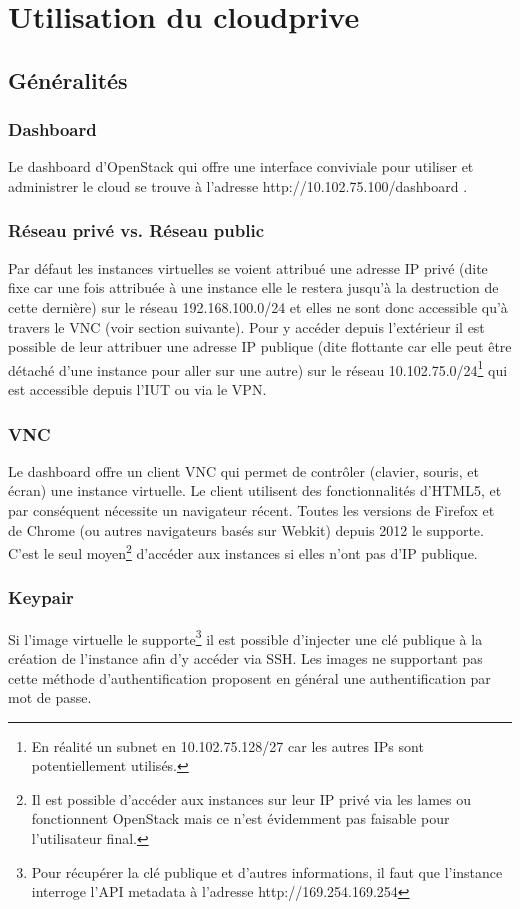 \documentclass[a4paper,oneside]{report}
\begin{document}
\appendix
\chapter{Utilisation du \gls{cloudprive}}
\section{Généralités}
\subsection{Dashboard}
Le dashboard d'OpenStack qui offre une interface conviviale pour utiliser et administrer le cloud se trouve à l'adresse http://10.102.75.100/dashboard .

\subsection{Réseau privé vs. Réseau public}
Par défaut les instances virtuelles se voient attribué une adresse IP privé (dite fixe car une fois attribuée à une instance elle le restera jusqu'à la destruction de cette dernière) sur le réseau 192.168.100.0/24 et elles ne sont donc accessible qu'à travers le VNC (voir section suivante).
Pour y accéder depuis l'extérieur il est possible de leur attribuer une adresse IP publique (dite flottante car elle peut être détaché d'une instance pour aller sur une autre) sur le réseau 10.102.75.0/24\footnote{En réalité un subnet en 10.102.75.128/27 car les autres IPs sont potentiellement utilisés.} qui est accessible depuis l'IUT ou via le VPN.

\subsection{VNC}
Le dashboard offre un client VNC qui permet de contrôler (clavier, souris, et écran) une instance virtuelle. Le client utilisent des fonctionnalités d'HTML5, et par conséquent nécessite un navigateur récent. Toutes les versions de Firefox et de Chrome (ou autres navigateurs basés sur Webkit) depuis 2012 le supporte.\newline
C'est le seul moyen\footnote{Il est possible d'accéder aux instances sur leur IP privé via les lames ou fonctionnent OpenStack mais ce n'est évidemment pas faisable pour l'utilisateur final.} d'accéder aux instances si elles n'ont pas d'IP publique.

\subsection{Keypair}
Si l'image virtuelle le supporte\footnote{Pour récupérer la clé publique et d'autres informations, il faut que l'instance interroge l'API metadata à l'adresse http://169.254.169.254} il est possible d'injecter une clé publique à la création de l'instance afin d'y accéder via SSH.
Les images ne supportant pas cette méthode d'authentification proposent en général une authentification par mot de passe.
\end{document}
